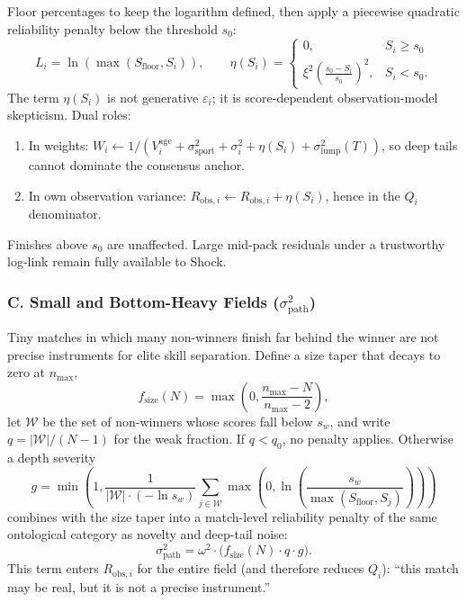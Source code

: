 \documentclass[12pt]{article}
\newcommand{\sigmai}{\sigma_i^2}
\newcommand{\ssport}{\sigma_{\mathrm{sport}}^2}      %
\newcommand{\xii}{\xi^2}
\newcommand{\omegai}{\omega^2}
\newcommand{\slump}{\sigma_{\mathrm{lump}}^2}  %
\newcommand{\szero}{s_0}
\begin{document}
	Floor percentages to keep the logarithm defined, then apply a piecewise quadratic reliability penalty below the threshold $\szero$:
	\begin{equation}
		L_i = \ln(\max(S_{\mathrm{floor}}, S_i)), \qquad
		\eta(S_i) =
		\begin{cases}
			0, & S_i \ge \szero \\
			\xii \left(\frac{\szero - S_i}{\szero}\right)^2, & S_i < \szero.
		\end{cases}
	\end{equation}
	The term $\eta(S_i)$ is not generative $\varepsilon_i$; it is score-dependent observation-model skepticism. Dual roles:
	\begin{enumerate}
		\item In weights: $W_i \leftarrow 1/(V_i^{\mathrm{age}} + \ssport + \sigmai + \eta(S_i) + \slump(T))$, so deep tails cannot dominate the consensus anchor.
		\item In own observation variance: $R_{\mathrm{obs},i} \leftarrow R_{\mathrm{obs},i} + \eta(S_i)$, hence in the $Q_i$ denominator.
	\end{enumerate}
	Finishes above $\szero$ are unaffected. Large mid-pack residuals under a trustworthy log-link remain fully available to Shock.
	
	\subsubsection*{C. Small and Bottom-Heavy Fields ($\sigma_{\mathrm{path}}^2$)}
	\label{sec:weakfield-overview}
	Tiny matches in which many non-winners finish far behind the winner are not precise instruments for elite skill separation. Define a size taper that decays to zero at $n_{\mathrm{max}}$,
	\begin{equation}
		f_{\mathrm{size}}(N) = \max\!\left(0,\frac{n_{\mathrm{max}} - N}{n_{\mathrm{max}} - 2}\right),
	\end{equation}
	let $\mathcal{W}$ be the set of non-winners whose scores fall below $s_w$, and write $q = |\mathcal{W}|/(N-1)$ for the weak fraction. If $q < q_0$, no penalty applies. Otherwise a depth severity
	\begin{equation}
		g = \min\!\left(1,\frac{1}{|\mathcal{W}| \cdot (-\ln s_w)} \sum_{j \in \mathcal{W}} \max\!\left(0,\ln\!\left(\frac{s_w}{\max(S_{\mathrm{floor}}, S_j)}\right)\right)\right)
	\end{equation}
	combines with the size taper into a match-level reliability penalty of the same ontological category as novelty and deep-tail noise:
	\begin{equation}
		\sigma_{\mathrm{path}}^2 = \omegai \cdot \bigl(f_{\mathrm{size}}(N) \cdot q \cdot g\bigr).
	\end{equation}
	This term enters $R_{\mathrm{obs},i}$ for the entire field (and therefore reduces $Q_i$): ``this match may be real, but it is not a precise instrument.''
	
\end{document}
